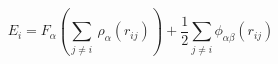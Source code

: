 \documentclass[12pt]{article}
\begin{document}
$$
   E_i = F_\alpha \left(\sum_{j \neq i}\ \rho_\alpha (r_{ij})\right) + 
   \frac{1}{2} \sum_{j \neq i} \phi_{\alpha\beta} (r_{ij})
$$
\end{document}
